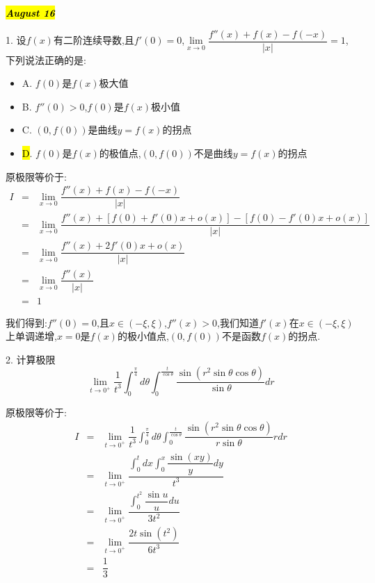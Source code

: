 \hl{\textbf{\textit{August 16}}}

1. 设$f(x)$有二阶连续导数,且$f'(0)=0$,$\lim\limits_{x\rightarrow 0}\dfrac{f''(x)+f(x)-f(-x)}{|x|}=1$,下列说法正确的是:
\begin{itemize}
	\item A. $f(0)$是$f(x)$极大值
	\item B. $f''(0)>0$,$f(0)$是$f(x)$极小值
	\item C. $(0,f(0))$是曲线$y=f(x)$的拐点
	\item \hl{D}. $f(0)$是$f(x)$的极值点,$(0,f(0))$不是曲线$y=f(x)$的拐点
\end{itemize}
\begin{solution}

	原极限等价于:  
	\begin{eqnarray*}
		I&=&\lim\limits_{x\rightarrow 0}\dfrac{f''(x)+f(x)-f(-x)}{|x|}\\
		&=&\lim\limits_{x\rightarrow 0}\dfrac{f''(x)+\left[f(0)+f'(0)x+o(x)\right] -\left[ f(0)-f'(0)x+o(x)\right]}{|x|}\\
		&=&\lim\limits_{x\rightarrow 0}\dfrac{f''(x)+2f'(0)x+o(x)}{|x|}\\
		&=&\lim\limits_{x\rightarrow 0}\dfrac{f''(x)}{|x|}\\
		&=&1
	\end{eqnarray*}

	我们得到:$f''(0)=0$,且$x\in(-\xi,\xi)$,$f''(x)>0$,我们知道$f'(x)$在$x\in(-\xi,\xi)$上单调递增,$x=0$是$f(x)$的极小值点,$(0,f(0))$不是函数$f(x)$的拐点.
\end{solution}

2. 计算极限$$\lim\limits_{t\rightarrow 0^{+}}\dfrac{1}{t^3}\int_{0}^{\frac{\pi}{4}}d\theta\int_{0}^{\frac{t}{\cos \theta}}\dfrac{\sin(r^2\sin\theta\cos\theta)}{\sin\theta}dr$$
\begin{solution}

	原极限等价于:  
	\begin{eqnarray*}
		I&=&\lim\limits_{t\rightarrow 0^{+}}\dfrac{1}{t^3}\int_{0}^{\frac{\pi}{4}}d\theta\int_{0}^{\frac{t}{\cos \theta}}\dfrac{\sin(r^2\sin\theta\cos\theta)}{r\sin\theta}rdr\\
		&=&\lim\limits_{t\rightarrow 0^{+}}\dfrac{\int_{0}^{t}dx\int_{0}^{x}\dfrac{\sin(xy)}{y}dy}{t^3}\\
		&=&\lim\limits_{t\rightarrow 0^{+}}\dfrac{\int_{0}^{t^2}\dfrac{\sin u}{u}du}{3t^2}\\
		&=&\lim\limits_{t\rightarrow 0^{+}}\dfrac{2t\sin(t^2)}{6t^3}\\
		&=&\dfrac{1}{3}
	\end{eqnarray*}
\end{solution}

